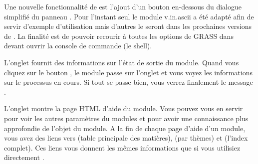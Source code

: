 
Une nouvelle fonctionnalité de \qg \CURRENT est l'ajout d'un bouton  en-dessous du dialogue simplifié du panneau . Pour l'instant seul le module v.in.ascii a été adapté afin de servir d'exemple d'utilisation mais d'autres le seront dans les prochaines versions de \qg. La finalité est de pouvoir recourir à toutes les options de GRASS dans devant ouvrir la console de commande (le shell).


L'onglet  fournit des informations sur l'état de sortie du module. Quand vous cliquez sur le bouton , le module passe sur l'onglet  et vous voyez les informations sur le processus en cours. Si tout se passe bien, vous verrez finalement le message .


L'onglet  montre la page HTML d'aide du module. Vous pouvez vous en servir pour voir les autres paramètres du modules et pour avoir une
connaissance plus approfondie de l'objet du module. A la fin de chaque page d'aide d'un module, vous avez des liens vers  (table principale des matières), (par thèmes) et (l'index complet). Ces liens vous donnent les mêmes informations que si vous utilisiez directement .

